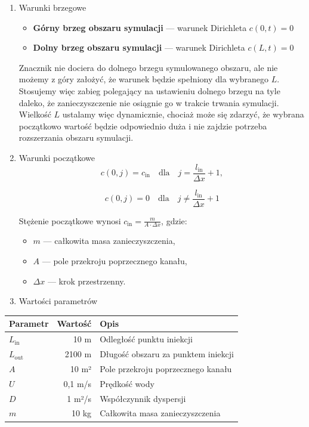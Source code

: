 \documentclass[
  polish,
  letterpaper,
  DIV=11,
  numbers=noendperiod]{scrartcl}
\newcounter{none} %
\providecommand{\tightlist}{%
  \setlength{\itemsep}{0pt}\setlength{\parskip}{0pt}}
\begin{document}
\begin{enumerate}
\def\labelenumi{\arabic{enumi}.}
\item
  Warunki brzegowe

  \begin{itemize}
  \tightlist
  \item
    \textbf{Górny brzeg obszaru symulacji} --- warunek Dirichleta
    \(c(0,t)=0\)
  \item
    \textbf{Dolny brzeg obszaru symulacji} --- warunek Dirichleta
    \(c(L,t)=0\)
  \end{itemize}

  Znacznik nie dociera do dolnego brzegu symulowanego obszaru, ale nie
  możemy z góry założyć, że warunek będzie spełniony dla wybranego
  \(L\). Stosujemy więc zabieg polegający na ustawieniu dolnego brzegu
  na tyle daleko, że zanieczyszczenie nie osiągnie go w trakcie trwania
  symulacji. Wielkość \(L\) ustalamy więc dynamicznie, chociaż może się
  zdarzyć, że wybrana początkowo wartość będzie odpowiednio duża i nie
  zajdzie potrzeba rozszerzania obszaru symulacji.
\item
  Warunki początkowe \[
   c(0,j)=c_{\mathrm{in}}
   \quad \text{dla} \quad j=\frac{l_{\mathrm{in}}}{\Delta x}+1 ,
  \]

  \[
   c(0,j)=0 \quad \text{dla} \quad
   j\neq\frac{l_{\mathrm{in}}}{\Delta x}+1
   \]

  Stężenie początkowe wynosi
  \(c_{\mathrm{in}}=\frac{m}{A\cdot\Delta x}\), gdzie:

  \begin{itemize}
  \tightlist
  \item
    \(m\) --- całkowita masa zanieczyszczenia,
  \item
    \(A\) --- pole przekroju poprzecznego kanału,
  \item
    \(\Delta x\) --- krok przestrzenny.
  \end{itemize}
\item
  Wartości parametrów
\end{enumerate}

{\def\LTcaptype{none} %
\begin{longtable}[]{@{}lrl@{}}
\toprule\noalign{}
Parametr & Wartość & Opis \\
\midrule\noalign{}
\endhead
\bottomrule\noalign{}
\endlastfoot
\(L_{\mathrm{in}}\) & 10 m & Odległość punktu iniekcji \\
\(L_{\mathrm{out}}\) & 2100 m & Długość obszaru za punktem iniekcji \\
\(A\) & 10 m² & Pole przekroju poprzecznego kanału \\
\(U\) & 0,1 m/s & Prędkość wody \\
\(D\) & 1 m²/s & Współczynnik dyspersji \\
\(m\) & 10 kg & Całkowita masa zanieczyszczenia \\
\end{longtable}
}
\end{document}
